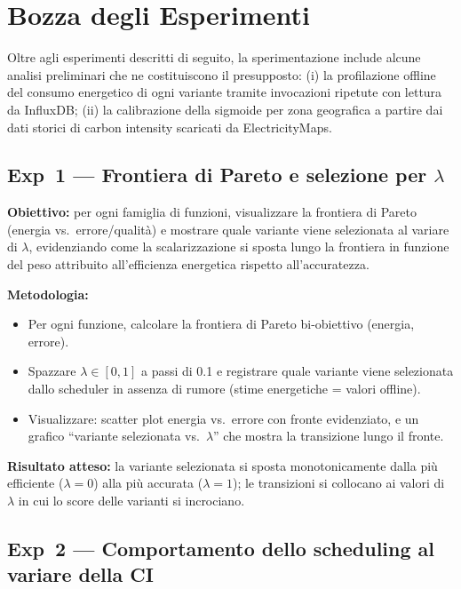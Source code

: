 \documentclass[a4paper,11pt]{article}
\begin{document}
\section{Bozza degli Esperimenti}

Oltre agli esperimenti descritti di seguito, la sperimentazione include alcune analisi
preliminari che ne costituiscono il presupposto: (i) la profilazione offline del consumo
energetico di ogni variante tramite invocazioni ripetute con lettura da InfluxDB;
(ii) la calibrazione della sigmoide per zona geografica a partire dai dati storici di
carbon intensity scaricati da ElectricityMaps.

\subsection{Exp~1 --- Frontiera di Pareto e selezione per
  \texorpdfstring{$\lambda$}{lambda}}

\textbf{Obiettivo:} per ogni famiglia di funzioni, visualizzare la frontiera di Pareto
(energia vs.\ errore/qualità) e mostrare quale variante viene selezionata al variare di
$\lambda$, evidenziando come la scalarizzazione si sposta lungo la frontiera in funzione
del peso attribuito all'efficienza energetica rispetto all'accuratezza.

\medskip
\textbf{Metodologia:}
\begin{itemize}
  \item Per ogni funzione, calcolare la frontiera di Pareto bi-obiettivo
    (energia, errore).
  \item Spazzare $\lambda \in [0, 1]$ a passi di 0.1 e registrare quale variante viene
    selezionata dallo scheduler in assenza di rumore (stime energetiche = valori
    offline).
  \item Visualizzare: scatter plot energia vs.\ errore con fronte evidenziato, e un
    grafico ``variante selezionata vs.\ $\lambda$'' che mostra la transizione lungo il
    fronte.
\end{itemize}

\textbf{Risultato atteso:} la variante selezionata si sposta monotonicamente dalla più
efficiente ($\lambda = 0$) alla più accurata ($\lambda = 1$); le transizioni si
collocano ai valori di $\lambda$ in cui lo score delle varianti si incrociano.

\subsection{Exp~2 --- Comportamento dello scheduling al variare della CI}
\end{document}
